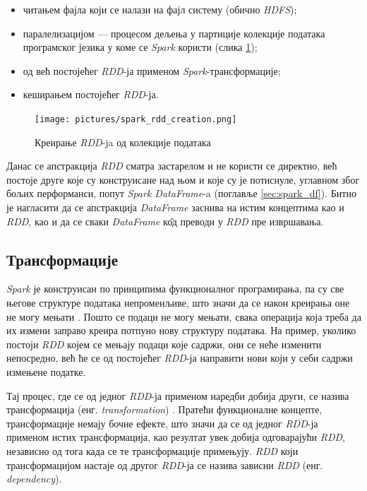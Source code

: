 \documentclass[12pt,oneside]{memoir}
\begin{document}
\begin{itemize}
\item читањем фајла који се налази на фајл систему (обично \textit{HDFS});
\item паралелизацијом --- процесом дељења у партиције колекције података програмског језика у коме се \textit{Spark} користи (слика \ref{fig:spark_rdd_creation_png});
\item од већ постојећег \textit{RDD}-ја применом \textit{Spark}-трансформације;
\item кеширањем постојећег \textit{RDD}-ја.
\end{itemize}

\begin{figure}[!ht]
  \centering
  \texttt{[image: pictures/spark\_rdd\_creation.png]}
  \caption{Креирање \textit{RDD}-ja од колекције података}
  \label{fig:spark_rdd_creation_png}
\end{figure}

Данас се апстракција \textit{RDD} сматра застарелом и не користи се директно, већ постоје друге које су конструисане над њом и које су је потиснуле, углавном због бољих перформанси, попут \textit{Spark DataFrame}-a (поглавље \ref{sec:spark_df}). Битно је нагласити да се апстракција \textit{DataFrame} заснива на истим концептима као и \textit{RDD}, као и да се сваки \textit{DataFrame} к\^{о}д преводи у \textit{RDD} пре извршавања.

\subsection{Трансформације}
\label{subsec:spark_transf}

\textit{Spark} је конструисан по принципима функционалног програмирања, па су све његове структуре података непроменљиве, што значи да се након креирања оне не могу мењати \cite{spark_guide}. Пошто се подаци не могу мењати, свака операција која треба да их измени заправо креира потпуно нову структуру података. На пример, уколико постоји \textit{RDD} којем се мењају подаци које садржи, они се неће изменити непосредно, већ ће се од постојећег \textit{RDD}-ја направити нови који у себи садржи измењене податке.

Тај процес, где се од једног \textit{RDD}-ја применом наредби добија други, се назива трансформација (енг. \textit{transformation})  \cite{spark_guide}. Пратећи функционалне концепте, трансформације немају бочне ефекте, што значи да се од једног \textit{RDD}-ја применом истих трансформација, као резултат увек добија одговарајући \textit{RDD}, независно од тога када се те трансформације примењују. \textit{RDD} који трансформацијом настаје од другог \textit{RDD}-ја се назива зависни \textit{RDD} (енг. \textit{dependency}).
\end{document}
